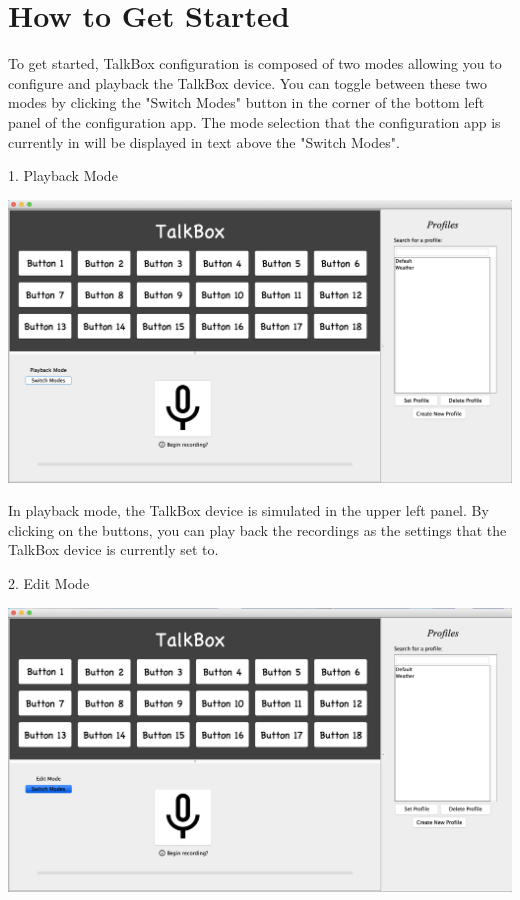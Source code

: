 \section{How to Get Started}
\medskip 
To get started, TalkBox configuration is composed of two modes allowing you to configure and playback the TalkBox device. You can toggle between these two modes by clicking the "Switch Modes" button in the corner of the bottom left panel of the configuration app. The mode selection that the configuration app is currently in will be displayed in text above the "Switch Modes". 

\medskip

1. Playback Mode

\medskip
\newline
\includegraphics[width=\textwidth]{playback.png}
\medskip

In playback mode, the TalkBox device is simulated in the upper left panel. By clicking on the buttons, you can play back the recordings as the settings that the TalkBox device is currently set to. 
\medskip
\newpage

2. Edit Mode

\medskip

\includegraphics[width=\textwidth]{editmode.png}
\medskip


